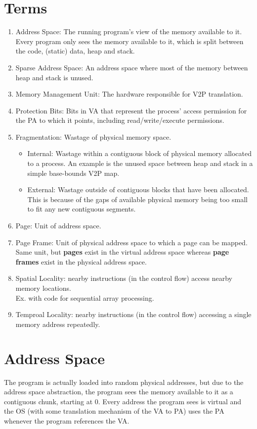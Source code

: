\documentclass[10pt]{report}
\begin{document}
\section*{Terms}
\begin{enumerate}
    \item Address Space: The running program's view of the memory available to it. Every program only sees the memory available to it, which is split between the code, (static) data, heap and stack.
    \item Sparse Address Space: An address space where most of the
    memory between heap and stack is unused.
    \item Memory Management Unit: The hardware responsible for V2P translation.
    \item Protection Bits: Bits in VA that represent the process'
    access permission for the PA to which it points, including read/write/execute permissions. 
    \item Fragmentation: Wastage of physical memory space.
    \begin{itemize}
        \item Internal: Wastage within a contiguous block of physical memory allocated to a process. An example is the unused space between heap and stack in a simple base-bounds V2P map.
        \item External: Wastage outside of contiguous blocks that have been allocated. This is because of the gaps of available physical memory being too small to fit any new contiguous segments. 
    \end{itemize}
    \item Page: Unit of address space.
    \item Page Frame: Unit of physical address space to which a page can be mapped. Same unit, but \textbf{pages} exist in the
    virtual address space whereas \textbf{page frames} exist
    in the physical address space.
    \item Spatial Locality: nearby instructions (in the control flow) access nearby memory locations.\\ Ex. with code for sequential array processing.
    \item Temproal Locality: nearby instructions (in the control flow) accessing a single memory address repeatedly.
\end{enumerate}
\section{Address Space}
The program is actually loaded into random physical addresses, but due to the address space
abstraction, the program sees the memory available to it as a contiguous chunk, starting at 0.
Every address the program sees is virtual and the OS (with some translation mechanism
of the VA to PA) uses the PA whenever the program references the VA.
\end{document}
